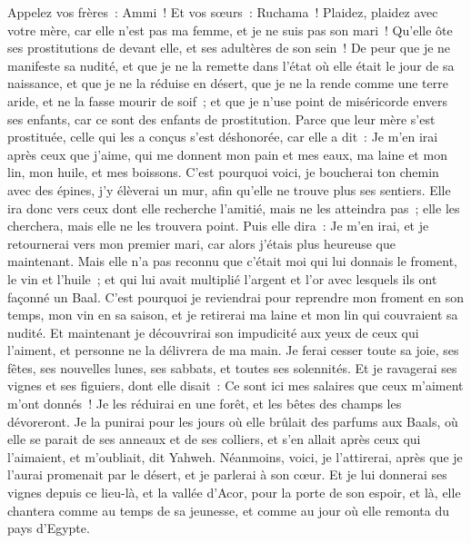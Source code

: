 \begin{multicols}{2}
Appelez vos frères~: Ammi~! Et vos sœurs~: Ruchama~!
Plaidez, plaidez avec votre mère, car elle n'est pas ma femme, et je ne suis pas son mari~! Qu'elle ôte ses prostitutions de devant elle, et ses adultères de son sein~!
De peur que je ne manifeste sa nudité, et que je ne la remette dans l'état où elle était le jour de sa naissance, et que je ne la réduise en désert, que je ne la rende comme une terre aride, et ne la fasse mourir de soif~;
et que je n'use point de miséricorde envers ses enfants, car ce sont des enfants de prostitution.
Parce que leur mère s'est prostituée, celle qui les a conçus s'est déshonorée, car elle a dit~: Je m'en irai après ceux que j'aime, qui me donnent mon pain et mes eaux, ma laine et mon lin, mon huile, et mes boissons.
C'est pourquoi voici, je boucherai ton chemin avec des épines, j'y élèverai un mur, afin qu'elle ne trouve plus ses sentiers.
Elle ira donc vers ceux dont elle recherche l'amitié, mais ne les atteindra pas~; elle les cherchera, mais elle ne les trouvera point. Puis elle dira~: Je m'en irai, et je retournerai vers mon premier mari, car alors j'étais plus heureuse que maintenant.
Mais elle n'a pas reconnu que c'était moi qui lui donnais le froment, le vin et l'huile~; et qui lui avait multiplié l'argent et l'or avec lesquels ils ont façonné un Baal.
C'est pourquoi je reviendrai pour reprendre mon froment en son temps, mon vin en sa saison, et je retirerai ma laine et mon lin qui couvraient sa nudité.
Et maintenant je découvrirai son impudicité aux yeux de ceux qui l'aiment, et personne ne la délivrera de ma main.
Je ferai cesser toute sa joie, ses fêtes, ses nouvelles lunes, ses sabbats, et toutes ses solennités.
Et je ravagerai ses vignes et ses figuiers, dont elle disait~: Ce sont ici mes salaires que ceux m'aiment m'ont donnés~! Je les réduirai en une forêt, et les bêtes des champs les dévoreront.
Je la punirai pour les jours où elle brûlait des parfums aux Baals, où elle se parait de ses anneaux et de ses colliers, et s'en allait après ceux qui l'aimaient, et m'oubliait, dit Yahweh.
Néanmoins, voici, je l'attirerai, après que je l'aurai promenait par le désert, et je parlerai à son cœur.
Et je lui donnerai ses vignes depuis ce lieu-là, et la vallée d'Acor, pour la porte de son espoir, et là, elle chantera comme au temps de sa jeunesse, et comme au jour où elle remonta du pays d'Egypte.

\end{multicols}
